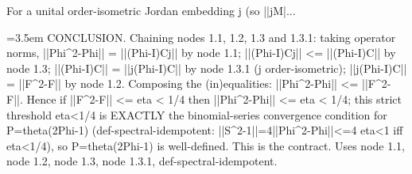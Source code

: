 \documentclass{article}
\newcommand{\step}[1]{\par\noindent\hangindent=3.5em\hangafter=1%
  \makebox[3.5em][l]{\textbf{#1.}}}
\begin{document}
\begin{proofbox}{For a unital order-isometric Jordan embedding j (so ||jM|...}
\step{1.4} CONCLUSION. Chaining nodes 1.1, 1.2, 1.3 and 1.3.1: taking operator norms, ||Phi\textasciicircum{}2-Phi|| = ||(Phi-I)Cj|| by node 1.1; ||(Phi-I)Cj|| <= ||(Phi-I)C|| by node 1.3; ||(Phi-I)C|| = ||j(Phi-I)C|| by node 1.3.1 (j order-isometric); ||j(Phi-I)C|| = ||F\textasciicircum{}2-F|| by node 1.2. Composing the (in)equalities: ||Phi\textasciicircum{}2-Phi|| <= ||F\textasciicircum{}2-F||. Hence if ||F\textasciicircum{}2-F|| <= eta < 1/4 then ||Phi\textasciicircum{}2-Phi|| <= eta < 1/4; this strict threshold eta<1/4 is EXACTLY the binomial-series convergence condition for P=theta(2Phi-1) (def-spectral-idempotent: ||S\textasciicircum{}2-1||=4||Phi\textasciicircum{}2-Phi||<=4 eta<1 iff eta<1/4), so P=theta(2Phi-1) is well-defined. This is the contract. Uses node 1.1, node 1.2, node 1.3, node 1.3.1, def-spectral-idempotent. \\[4pt]
\end{proofbox}
\end{document}
